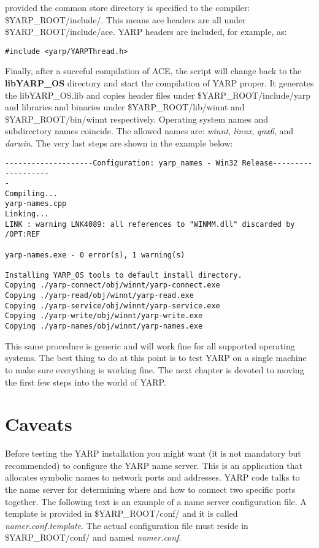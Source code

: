 \noindent provided the common store directory is specified to the compiler: \$YARP\_ROOT/include/. This means ace headers are all under \$YARP\_ROOT/include/ace. YARP headers are included, for example, as:

\begin{verbatim}
#include <yarp/YARPThread.h>
\end{verbatim}

Finally, after a succeful compilation of ACE, the script will change back to the {\bf libYARP\_OS} directory and start the compilation of YARP proper. It generates the libYARP\_OS.lib and copies header files under \$YARP\_ROOT/include/yarp and libraries and binaries under \$YARP\_ROOT/lib/winnt and \$YARP\_ROOT/bin/winnt respectively. Operating system names and subdirectory names coincide. The allowed names are: {\em winnt}, {\em linux}, {\em qnx6}, and {\em darwin}. The very last steps are shown in the example below:

\begin{verbatim}
--------------------Configuration: yarp_names - Win32 Release-------------------
-
Compiling...
yarp-names.cpp
Linking...
LINK : warning LNK4089: all references to "WINMM.dll" discarded by /OPT:REF

yarp-names.exe - 0 error(s), 1 warning(s)

Installing YARP_OS tools to default install directory.
Copying ./yarp-connect/obj/winnt/yarp-connect.exe
Copying ./yarp-read/obj/winnt/yarp-read.exe
Copying ./yarp-service/obj/winnt/yarp-service.exe
Copying ./yarp-write/obj/winnt/yarp-write.exe
Copying ./yarp-names/obj/winnt/yarp-names.exe

\end{verbatim}

This same procedure is generic and will work fine for all supported operating systems. The best thing to do at this point is to test YARP on a single machine to make sure everything is working fine. The next chapter is devoted to moving the first few steps into the world of YARP.


\section{Caveats}
\label{sect:caveats}

Before testing the YARP installation you might want (it is not mandatory but recommended) to configure the YARP name server. This is an application that allocates symbolic names to network ports and addresses. YARP code talks to the name server for determining where and how to connect two specific ports together. The following text is an example of a name server configuration file. A template is provided in \$YARP\_ROOT/conf/ and it is called {\em namer.conf.template}. The actual configuration file must reside in \$YARP\_ROOT/conf/ and named {\em namer.conf}.

